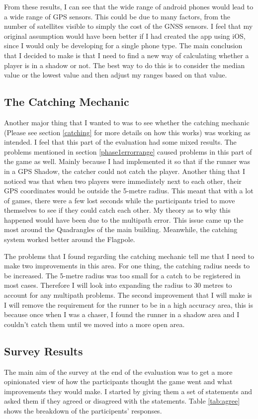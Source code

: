 \documentclass{l4proj}
\begin{document}
From these results, I can see that the wide range of android phones would lead to a wide range of GPS sensors. This could be due to many factors, from the number of satellites
visible to simply the cost of the GNSS sensors. I feel that my original assumption would have been better if I had created the app using iOS, since I would only be developing
for a single phone type. The main conclusion that I decided to make is that I need to find a new way of calculating whether a player is in a shadow or not.
The best way to do this is to consider the median value or the lowest value and then adjust my ranges based on that value.  

\subsection{The Catching Mechanic}
\label{phase1catching}
Another major thing that I wanted to was to see whether the catching mechanic (Please see section \ref{catching} for more details on how this works)
was working as intended. I feel that this part of the evaluation had some mixed results. The problems mentioned in section
\ref{phase1errorrange} caused problems in this part of the game as well. Mainly because I had implemented it so that if the
runner was in a GPS Shadow, the catcher could not catch the player. Another thing that I noticed was that when two players
were immediately next to each other, their GPS coordinates would be outside the 5-metre radius. This meant that with a lot of
games, there were a few lost seconds while the participants tried to move themselves to see if they could catch each other.
My theory as to why this happened would have been due to the multipath error. This issue came up the most around the Quadrangles
of the main building. Meanwhile, the catching system worked better around the Flagpole.

The problems that I found regarding the catching mechanic tell me that I need to make two improvements in this area. For one
thing, the catching radius needs to be increased. The 5-metre radius was too small for a catch to be registered in most cases. Therefore
I will look into expanding the radius to 30 metres to account for any multipath problems. The second improvement that I will
make is I will remove the requirement for the runner to be in a high accuracy area, this is because once when I was a chaser,
I found the runner in a shadow area and I couldn't catch them until we moved into a more open area.

\subsection{Survey Results}
\label{phase1survey}
The main aim of the survey at the end of the evaluation was to get a more opinionated view of how the participants
thought the game went and what improvements they would make. I started by giving them a set of statements and asked
them if they agreed or disagreed with the statements. Table \ref{tab:agree} shows the breakdown of the participents'
responses.
\end{document}
